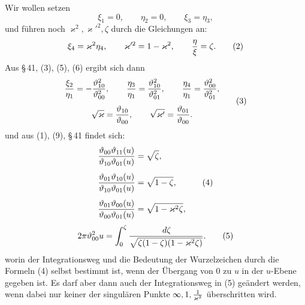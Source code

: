 \documentclass[11pt]{article}
\providecommand{\dd}{\,d}
\providecommand{\tht}{\vartheta}
\begin{document}
Wir wollen setzen
\begin{equation}
\xi_1=0,
\qquad \eta_2=0,
\qquad \xi_3=\eta_3,
\tag{1}
\end{equation}
und führen noch $\varkappa^2,\varkappa'^2,\zeta$ durch die Gleichungen an:
\begin{equation}
\xi_4=\varkappa^2\eta_4,
\qquad
\varkappa'^2=1-\varkappa^2,
\qquad
{\eta\over\xi}=\zeta.
\tag{2}
\end{equation}
Aus \S\,41, (3), (5), (6) ergibt sich dann
\begin{equation}
\begin{gathered}
{\xi_2\over\eta_1}=-{\tht_{10}^{2}\over\tht_{00}^{2}},
\qquad
{\eta_3\over\eta_1}={\tht_{10}^{2}\over\tht_{01}^{2}},
\qquad
{\eta_4\over\eta_1}={\tht_{00}^{2}\over\tht_{01}^{2}},\\[0.4em]
\sqrt{\varkappa}={\tht_{10}\over\tht_{00}},
\qquad
\sqrt{\varkappa'}={\tht_{01}\over\tht_{00}}.
\end{gathered}
\tag{3}
\end{equation}
und aus (1), (9), \S\,41 findet sich:
\begin{equation}
\begin{aligned}
{\tht_{00}\tht_{11}(u)\over \tht_{10}\tht_{01}(u)}&=\sqrt\zeta,\\[0.4em]
{\tht_{01}\tht_{10}(u)\over \tht_{10}\tht_{01}(u)}&=\sqrt{1-\zeta},\\[0.4em]
{\tht_{01}\tht_{00}(u)\over \tht_{00}\tht_{01}(u)}&=\sqrt{1-\varkappa^2\zeta},
\end{aligned}
\tag{4}
\end{equation}
\begin{equation}
2\pi\tht_{00}^{2}u=\int_0^\zeta {\dd\zeta\over \sqrt{\zeta(1-\zeta)(1-\varkappa^2\zeta)}}.
\tag{5}
\end{equation}
worin der Integrationsweg und die Bedeutung der Wurzelzeichen durch die Formeln (4) selbst bestimmt ist, wenn der Übergang von 0 zu $u$ in der $u$-Ebene gegeben ist. Es darf aber dann auch der Integrationsweg in (5) geändert werden, wenn dabei nur keiner der singulären Punkte $\infty,1,{1\over\varkappa^2}$ überschritten wird.
\end{document}
